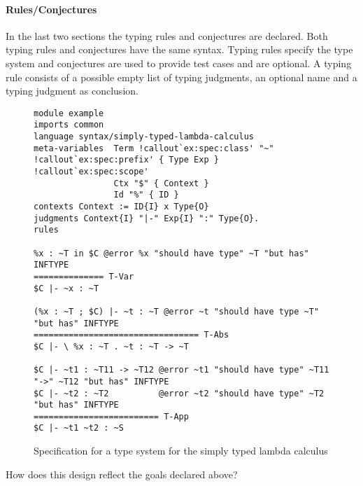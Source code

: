 \paragraph{Rules/Conjectures} In the last two sections the typing
rules and conjectures are declared. Both typing rules and conjectures
have the same syntax. Typing rules specify the type system and
conjectures are used to provide test cases and are optional. A typing
rule consists of a possible empty list of typing judgments, an
optional name and a typing judgment as conclusion.

\begin{figure}
\scriptsize
\begin{verbatim}
module example
imports common
language syntax/simply-typed-lambda-calculus
meta-variables 	Term !callout`ex:spec:class' "~" !callout`ex:spec:prefix' { Type Exp } !callout`ex:spec:scope'
                Ctx "$" { Context }
                Id "%" { ID }
contexts Context := ID{I} x Type{O}
judgments Context{I} "|-" Exp{I} ":" Type{O}.
rules

%x : ~T in $C @error %x "should have type" ~T "but has" INFTYPE
============== T-Var
$C |- ~x : ~T

(%x : ~T ; $C) |- ~t : ~T @error ~t "should have type ~T" "but has" INFTYPE
================================= T-Abs
$C |- \ %x : ~T . ~t : ~T -> ~T

$C |- ~t1 : ~T11 -> ~T12 @error ~t1 "should have type" ~T11 "->" ~T12 "but has" INFTYPE
$C |- ~t2 : ~T2          @error ~t2 "should have type" ~T2 "but has" INFTYPE
========================= T-App
$C |- ~t1 ~t2 : ~S
\end{verbatim}
\caption{Specification for a type system for the simply typed lambda calculus}
\end{figure}

How does this design reflect the goals declared above?

